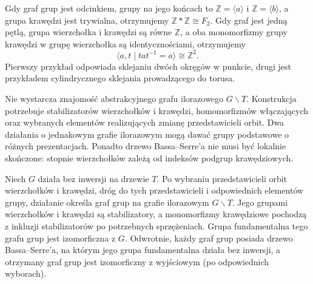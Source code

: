 \begin{przyklad}
Gdy graf grup jest odcinkiem, grupy na jego końcach to
$\mathbb Z=\langle a\rangle$ i
$\mathbb Z=\langle b\rangle$, a grupa krawędzi jest
trywialna, otrzymujemy $\mathbb Z*\mathbb Z\cong F_2$.
Gdy graf jest jedną pętlą, grupa wierzchołka i krawędzi
są równe $\mathbb Z$, a oba monomorfizmy grupy krawędzi
w grupę wierzchołka są identycznościami, otrzymujemy
\[
\langle a,t\mid tat^{-1}=a\rangle\cong\mathbb Z^2.
\]
Pierwszy przykład odpowiada sklejaniu dwóch okręgów
w punkcie, drugi jest przykładem cylindrycznego
sklejania prowadzącego do torusa.
\end{przyklad}

\begin{center}
\end{center}

\begin{uwaga}
Nie wystarcza znajomość abstrakcyjnego grafu ilorazowego
$G\backslash T$. Konstrukcja potrzebuje stabilizatorów
wierzchołków i krawędzi, homomorfizmów włączających oraz
wybranych elementów realizujących zmianę przedstawicieli orbit.
Dwa działania o jednakowym grafie ilorazowym mogą dawać
grupy podstawowe o różnych prezentacjach.
Ponadto drzewo Bassa--Serre'a nie musi być lokalnie skończone:
stopnie wierzchołków zależą od indeksów podgrup krawędziowych.
\end{uwaga}

\begin{twierdzenie}
Niech $G$ działa bez inwersji na drzewie $T$.
Po wybraniu przedstawicieli orbit wierzchołków i krawędzi,
dróg do tych przedstawicieli i odpowiednich elementów grupy,
działanie określa graf grup na grafie ilorazowym
$G\backslash T$. Jego grupami wierzchołków i krawędzi
są stabilizatory, a monomorfizmy krawędziowe pochodzą
z inkluzji stabilizatorów po potrzebnych sprzężeniach. Grupa fundamentalna tego
grafu grup jest izomorficzna z $G$. Odwrotnie, każdy graf
grup posiada drzewo Bassa--Serre'a, na którym jego grupa
fundamentalna działa bez inwersji, a otrzymany graf grup
jest izomorficzny z wyjściowym (po odpowiednich wyborach).
\end{twierdzenie}

